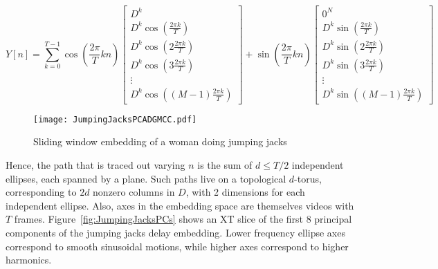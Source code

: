 \documentclass[a4paper,UKenglish]{lipics}
\begin{document}
\begin{equation}
Y[n] = \sum_{k = 0}^{T-1} \cos \left( \frac{2 \pi}{T} k n \right) \left[ \begin{array}{c} D^k \\ D^k \cos \left( \frac{2 \pi k}{T} \right) \\ D^k \cos \left( 2 \frac{2 \pi k}{T} \right) \\ D^k \cos \left( 3 \frac{2 \pi k}{T} \right) \\ \vdots \\ D^k \cos \left( (M-1) \frac{2 \pi k}{T} \right) \end{array} \right] + \sin \left( \frac{2 \pi}{T} k n \right) \left[ \begin{array}{c} 0^N \\ D^k \sin \left( \frac{2 \pi k}{T} \right) \\ D^k \sin \left( 2 \frac{2 \pi k}{T} \right) \\ D^k \sin \left( 3 \frac{2 \pi k}{T} \right) \\ \vdots \\ D^k \sin \left( (M-1) \frac{2 \pi k}{T} \right) \end{array} \right]
\end{equation}



\begin{figure}[]
	\centering
	\texttt{[image: JumpingJacksPCADGMCC.pdf]}
	\caption{Sliding window embedding of a woman doing jumping jacks}
	\label{fig:JumpingJacks}
\end{figure}

Hence, the path that is traced out varying $n$ is the sum of $d \leq T/2$ independent ellipses, each spanned by a plane.  Such paths live on a topological $d$-torus, corresponding to $2d$ nonzero columns in $D$, with 2 dimensions for each independent ellipse.  Also, axes in the embedding space are themselves videos with $T$ frames.  Figure~\ref{fig:JumpingJacksPCs} shows an XT slice of the first 8 principal components of the jumping jacks delay embedding.  Lower frequency ellipse axes correspond to smooth sinusoidal motions, while higher axes correspond to higher harmonics.
\end{document}
